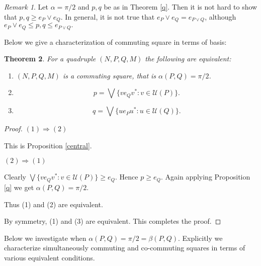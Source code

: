 \documentclass[11pt,letterpaper]{amsart}
\newtheorem{theorem}{Theorem}[section]
\theoremstyle{definition}
\theoremstyle{remark}
\newtheorem{remark}[theorem]{Remark}
\begin{document}
\begin{remark}
Let $\alpha= \pi/2$ and $p,q$ be as in Theorem \ref{q}.
Then it is not hard to show that $p,q \geq e_P \vee e_Q.$ In general, it is not true that $e_P \vee e_Q= e_{P\vee Q}$,
 although $e_P\vee e_Q\leq p,q\leq e_{P\vee Q}.$
\end{remark}


Below we give a characterization of commuting square in terms of basis:
\begin{theorem}\label{cs}
For a quadruple $(N, P,Q,M)$ the following are equivalent:
\begin{enumerate}

\item
$(N,P,Q,M)$ is a commuting square, that is $\alpha(P,Q) = \pi/2$.

\item $$p= \bigvee \{v e_Qv^*: v\in \mathcal{U}(P)\}.$$

\item  $$q=\bigvee \{u e_Pu^*: u\in \mathcal{U}(Q)\}.$$
\end{enumerate}
\end{theorem}
\begin{proof}
 $(1) \Rightarrow (2)$ 

This is Proposition \ref{central}.


\bigskip

$(2) \Rightarrow (1)$

Clearly $\bigvee \{v e_Qv^*: v\in \mathcal{U}(P)\} \geq e_Q$. Hence $p\geq e_Q$. Again applying Proposition \ref{q}
we get $\alpha(P,Q)= \pi/2$.

Thus (1) and (2) are equivalent.


By symmetry,  (1) and (3) are equivalent.
This completes the proof.
\end{proof}

Below we investigate when $\alpha(P,Q)= \pi/2= \beta(P,Q)$. Explicitly we characterize  simultaneously commuting and co-commuting squares
in terms of various equivalent conditions. 
\end{document}
